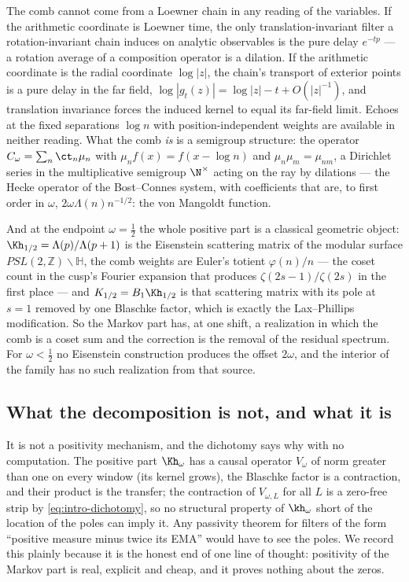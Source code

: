 The comb cannot come from a Loewner chain in any reading of the variables. If
the arithmetic coordinate is Loewner time, the only translation-invariant
filter a rotation-invariant chain induces on analytic observables is the pure
delay $e^{-tp}$ --- a rotation average of a composition operator is a dilation.
If the arithmetic coordinate is the radial coordinate $\log|z|$, the chain's
transport of exterior points is a pure delay in the far field,
$\log|g_t(z)|=\log|z|-t+O(|z|^{-1})$, and translation invariance forces the
induced kernel to equal its far-field limit. Echoes at the fixed separations
$\log n$ with position-independent weights are available in neither reading.
What the comb \emph{is} is a semigroup structure: the operator
$C_\omega=\sum_n\ct_n\mu_n$ with $\mu_nf(x)=f(x-\log n)$ and
$\mu_n\mu_m=\mu_{nm}$, a Dirichlet series in the multiplicative semigroup
$\N^\times$ acting on the ray by dilations --- the Hecke operator of the
Bost--Connes system, with coefficients that are, to first order in $\omega$,
$2\omega\Lambda(n)n^{-1/2}$: the von Mangoldt function.

And at the endpoint $\omega=\frac12$ the whole positive part is a classical
geometric object: $\Kh_{1/2}=\Lambda(p)/\Lambda(p+1)$ is the Eisenstein
scattering matrix of the modular surface $PSL(2,\mathbb Z)\backslash\mathbb H$,
the comb weights are Euler's totient $\varphi(n)/n$ --- the coset count in the
cusp's Fourier expansion that produces $\zeta(2s-1)/\zeta(2s)$ in the first
place --- and $K_{1/2}=B_1\Kh_{1/2}$ is that scattering matrix with its pole at
$s=1$ removed by one Blaschke factor, which is exactly the Lax--Phillips
modification. So the Markov part has, at one shift, a realization in which the
comb is a coset sum and the correction is the removal of the residual
spectrum. For $\omega<\frac12$ no Eisenstein construction produces the offset
$2\omega$, and the interior of the family has no such realization from that
source.

\subsection{What the decomposition is not, and what it is}

It is not a positivity mechanism, and the dichotomy says why with no
computation. The positive part $\Kh_\omega$ has a causal operator $\widehat
V_\omega$ of norm greater than one on every window (its kernel grows), the
Blaschke factor is a contraction, and their product is the transfer; the
contraction of $V_{\omega,L}$ for all $L$ is a zero-free strip by
\eqref{eq:intro-dichotomy}, so no structural property of $\kh_\omega$ short of
the location of the poles can imply it. Any passivity theorem for filters of
the form ``positive measure minus twice its EMA'' would have to see the poles.
We record this plainly because it is the honest end of one line of thought:
positivity of the Markov part is real, explicit and cheap, and it proves
nothing about the zeros.


